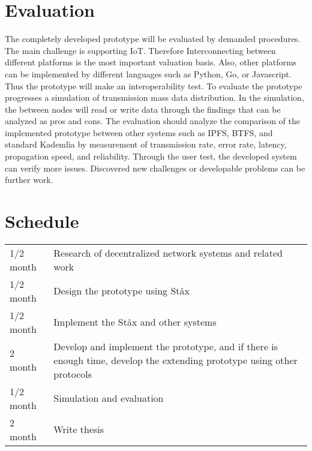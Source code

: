 \documentclass{article}
\begin{document}
\section{Evaluation}
The completely developed prototype will be evaluated by demanded procedures. The main challenge is supporting IoT. Therefore Interconnecting between different platforms is the most important valuation basis. Also, other platforms can be implemented by different languages such as Python, Go, or Javascript. Thus the prototype will make an interoperability test. To evaluate the prototype progresses a simulation of transmission mass data distribution. In the simulation, the between nodes will read or write data through the findings that can be analyzed as pros and cons. The evaluation should analyze the comparison of the implemented prototype between other systems such as IPFS, BTFS, and standard Kademlia by measurement of transmission rate, error rate, latency, propagation speed, and reliability. Through the user test, the developed system can verify more issues. Discovered new challenges or developable problems can be further work.

\section{Schedule}

\begin{table} [h]
	\centering
	\begin{tabular}{ p{2cm} p{13cm} }
		1/2 month & Research of decentralized network systems and related work \\
		1/2 month & Design the prototype using St\aa x \\
		1/2 month & Implement the St\aa x and other systems \\
		2 month & Develop and implement the prototype, and if there is enough time, develop the extending prototype using other protocols \\
		1/2 month & Simulation and evaluation \\
		2 month & Write thesis \\
	\end{tabular}
\end{table}





\end{document}
